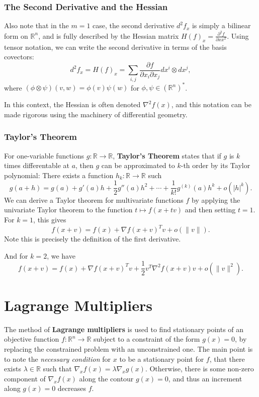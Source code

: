 \documentclass[reqno]{amsart}
\numberwithin{equation}{section}
\begin{document}
\subsubsection{The Second Derivative and the Hessian}

Also note that in the $m=1$ case, the second derivative $d^2f_x$ is simply a bilinear form
on $\mathbb R^n$, and is fully described by the Hessian matrix $H(f)_x =
\frac{\partial^2 f}{\partial x x ^T}$. Using tensor notation, we can write the second derivative
in terms of the basis covectors:
$$
    d^2f_x = H(f)_x = \sum_{i,j} \frac{\partial f}{\partial x_i \partial x_j} dx^i \otimes dx^j,
$$
where $(\phi \otimes \psi)(v,w) = \phi(v) \psi(w)$ for $\phi, \psi \in (\mathbb R^n)^*$.

In this context, the Hessian is often denoted $\nabla^2f(x)$, and this notation can be made
rigorous using the machinery of differential geometry.

\subsubsection{Taylor's Theorem}

For one-variable functions $g : \mathbb R \to \mathbb R$, \textbf{Taylor's Theorem} states
that if $g$ is $k$ times differentable at $a$, then $g$ can be approximated to $k$-th
order by its Taylor polynomial: There exists a function $h_k : \mathbb R \to \mathbb R$ such
$$
    g(a+h) = g(a) + g'(a)h + \frac12 g''(a)h^2 + \cdots + \frac{1}{k!} g^{(k)}(a) h^k +
        o(|h|^k).
$$
We can derive a Taylor theorem for multivariate functions $f$ by applying the univariate Taylor
theorem to the function $t \mapsto f(x + tv)$ and then setting $t=1$. For $k=1$, this gives
$$
    f(x + v) = f(x) + \nabla f(x+v)^T v + o(\|v\|).
$$
Note this is precisely the definition of the first derivative.

And for $k=2$, we have
$$
    f(x + v) = f(x) + \nabla f(x+v)^T v + \frac{1}{2} v^T \nabla^2 f(x+v) v + o(\|v\|^2).
$$

\section{Lagrange Multipliers}

The method of \textbf{Lagrange multipliers} is used to find stationary points of an objective
function $f: \mathbb R^n \to \mathbb R$ subject to a constraint of the form $g(x) = 0$,
by replacing the constrained problem with an unconstrained one.
The main point is to note the \emph{necessary condition}
for $x$ to be a stationary point for $f$, that there exists $\lambda \in \mathbb R$ such that
$\nabla_x f(x) = \lambda \nabla_x g(x)$. Otherwise, there is some non-zero component
of $\nabla_x f(x)$ along the contour $g(x) = 0$, and thus an increment along $g(x) = 0$
decreases $f$.
\end{document}
